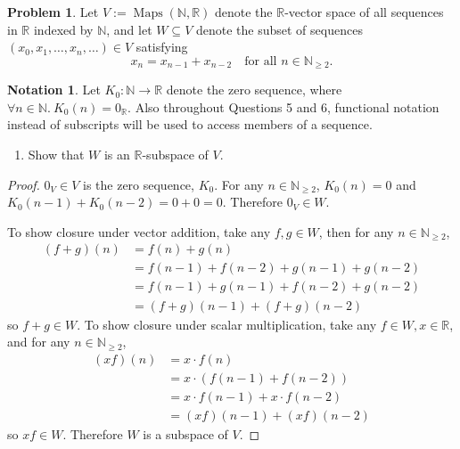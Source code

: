 \documentclass[11pt]{article}
\theoremstyle{definition}
\newtheorem{problem}{Problem}
\newtheorem*{notation}{Notation}
\numberwithin{lemma}{problem}
\numberwithin{equation}{problem}
\newcommand{\N}{\mathbb{N}}
\newcommand{\R}{\mathbb{R}}
\DeclareMathOperator{\Maps}{Maps}
\renewcommand{\geq}{\geqslant}
\begin{document}
\newpage
\begin{problem}
    Let $V:=\Maps(\N,\R)$ denote the $\R$-vector space of all sequences in $\R$ indexed by $\N$,
    and let $W\subseteq V$ denote the subset of sequences
    $\left( x_0, x_1, \dots, x_n, \dots \right)\in V$ satisfying
    \[
        x_n = x_{n-1} + x_{n-2} \quad\text{for all }n \in \N_{\geq 2}.
    \]
    \begin{notation}
        Let $K_0:\N \to \R$ denote the zero sequence, where $\forall n\in \N.~ K_0(n) = 0_\R$.
        Also throughout Questions 5 and 6, functional notation instead of subscripts
        will be used to access members of a sequence.
    \end{notation}
    \begin{enumerate}[label=(\alph*)]
        \item Show that $W$ is an $\R$-subspace of $V$.
    \end{enumerate}
\end{problem}
\begin{proof}
    $0_V \in V$ is the zero sequence, $K_0$.
    For any $n\in\N_{\geq 2}$, $K_0(n) = 0$ and $K_0(n-1) + K_0(n-2) = 0 + 0 = 0$.
    Therefore $0_V\in W$.

    To show closure under vector addition, take any $f, g\in W$,
    then for any $n\in \N_{\geq 2}$,
    \begin{align*}
        (f+g)(n) &= f(n) + g(n) \\
        &= f(n-1) + f(n-2) + g(n-1) + g(n-2)    \\
        &= f(n-1) + g(n-1) + f(n-2) + g(n-2)    \\
        &= (f+g)(n-1) + (f+g)(n-2)
    \end{align*}
    so $f+g\in W$.
    To show closure under scalar multiplication, take any $f\in W, x\in \R$, and
    for any $n\in \N_{\geq 2}$,
    \begin{align*}
        (xf)(n) &= x\cdot f(n)  \\
        &= x\cdot\left( f(n-1) + f(n-2) \right) \\
        &= x\cdot f(n-1) + x\cdot f(n-2) \\
        &= (xf)(n-1) + (xf)(n-2)
    \end{align*}
    so $xf \in W$. Therefore $W$ is a subspace of $V$.
\end{proof}
\end{document}
